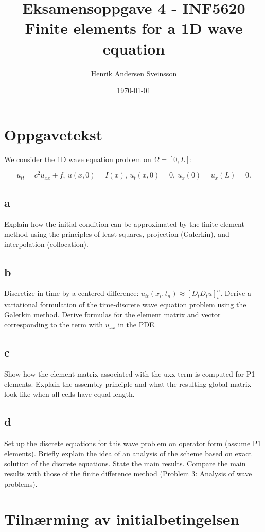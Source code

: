\documentclass[a4paper, 10pt]{article}
\author{Henrik Andersen Sveinsson}
\title{Eksamensoppgave 4 - INF5620 \\ \large Finite elements for a 1D wave equation }
\date{\today}
\begin{document}
\maketitle

\section{Oppgavetekst}
 We consider the 1D wave equation problem on $\Omega=[0,L]$:

\begin{equation}
	u_{tt}=c^2u_{xx}+f, \ u(x,0)=I(x), \ u_t(x,0)=0, \ u_x(0)=u_x(L)=0.
\end{equation}

\subsection{a}
Explain how the initial condition can be approximated by the finite element method using the principles of least squares, projection (Galerkin), and interpolation (collocation).

\subsection{b} 
Discretize in time by a centered difference: $u_{tt}(x_i,t_n)\approx[D_t D_tu]^n_i$. Derive a variational formulation of the time-discrete wave equation problem using the Galerkin method. Derive formulas for the element matrix and vector corresponding to the term with $u_{xx}$ in the PDE.

\subsection{c} Show how the element matrix associated with the uxx term is computed for P1 elements. Explain the assembly principle and what the resulting global matrix look like when all cells have equal length.

\subsection{d} Set up the discrete equations for this wave problem on operator form (assume P1 elements). Briefly explain the idea of an analysis of the scheme based on exact solution of the discrete equations. State the main results. Compare the main results with those of the finite difference method (Problem 3: Analysis of wave problems). 

\section{Tilnærming av initialbetingelsen}
\end{document}
